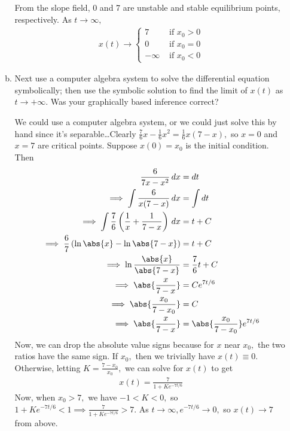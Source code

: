 \documentclass{article}
\begin{document}
\begin{enumerate}
\begin{enumerate}[(a)]
\begin{soln}
\begin{figure}[ht]
					\end{figure}
					From the slope field, 0 and 7 are unstable and stable equilibrium points, respectively. As $t\to\infty,$ 
					\begin{align*}
						x(t) \to \begin{cases}
							7 & \text{ if } x_0 > 0 \\
							0 & \text{ if } x_0 = 0 \\
							-\infty & \text{ if } x_0 < 0
						\end{cases}
					\end{align*}
				\end{soln}

			\item Next use a computer algebra system to solve the differential equation symbolically; then use the symbolic solution to find the limit of $x(t)$ as $t\to+\infty.$ Was your graphically based inference correct? 
				\begin{soln}
					We could use a computer algebra system, or we could just solve this by hand since it's separable\ldots Clearly $\frac{7}{6}x-\frac{1}{6}x^2 =  \frac{1}{6}x(7-x),$ so $x=0$ and $x=7$ are critical points. Suppose $x(0)=x_0$ is the initial condition. Then
					\begin{align*}
						\frac{6}{7x-x^2}\, dx &= dt \\
						\implies \int\frac{6}{x(7-x)}\, dx &= \int dt \\
						\implies \int \frac{7}{6}\left( \frac{1}{x} + \frac{1}{7-x} \right)\, dx &= t + C \\
						\implies \frac{6}{7} \left( \ln \abs{x}-\ln\abs{7-x} \right) &= t+C \\
						\implies \ln \frac{\abs{x}}{\abs{7-x}} &= \frac{7}{6}t + C \\
						\implies \abs{\frac{x}{7-x}} &= Ce^{7t/6} \\
						\implies \abs{\frac{x_0}{7-x_0}} &= C \\
						\implies \abs{\frac{x}{7-x}} &= \abs{\frac{x_0}{7-x_0}}e^{7t/6}
					\end{align*}
					Now, we can drop the absolute value signs because for $x$ near $x_0,$ the two ratios have the same sign. If $x_0,$ then we trivially have $x(t)\equiv0.$ Otherwise, letting $K=\frac{7-x_0}{x_0},$ we can solve for $x(t)$ to get
					\begin{align*}
						x(t) = \frac{7}{1+Ke^{-7t/6}}
					\end{align*}
					Now, when $x_0>7,$ we have $-1<K<0,$ so $1+Ke^{-7t/6}<1\implies \frac{7}{1+Ke^{-7t/6}}>7.$ As $t\to\infty, e^{-7t/6}\to 0,$ so $x(t)\to 7$ from above.


\end{soln}
\end{enumerate}
\end{enumerate}
\end{document}
